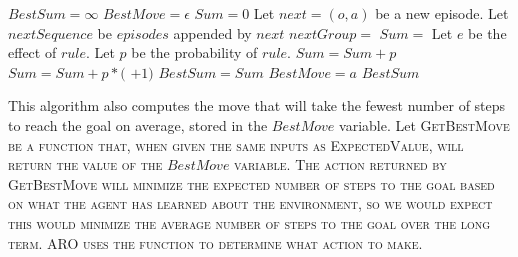 \documentclass[letterpaper]{article} %
\begin{document}

\begin{algorithmic}[1]
		\State $BestSum = \infty$
		\State $BestMove = \epsilon$
			\State $Sum = 0$
			\State Let $next = (o, a)$ be a new episode.
			\State Let $nextSequence$ be $episodes$ appended by $next$
			\State $nextGroup =$  %
				\State $Sum = $  \label{line:heuristic}
			\EndIf
				\State Let $e$ be the effect of $rule$.
				\State Let $p$ be the probability of $rule$.
					\State $Sum = Sum + p$
				\Else
					\State $Sum = Sum + p*($ $ + 1)$
				\EndIf
			\EndFor
				\State $BestSum = Sum$
				\State $BestMove = a$
			\EndIf
		\EndFor
	\State \Return $BestSum$
	\EndFunction
\end{algorithmic}

This algorithm also computes the move that will take the fewest number of steps to reach the goal on average, stored in the $BestMove$ variable. Let \scshape GetBestMove \normalfont be a function that, when given the same inputs as \scshape ExpectedValue\normalfont, will return the value of the $BestMove$ variable. The action returned by \scshape GetBestMove \normalfont will minimize the expected number of steps to the goal based on what the agent has learned about the environment, so we would expect this would minimize the average number of steps to the goal  over the long term. ARO uses the function to determine what action to make.
\end{document}
